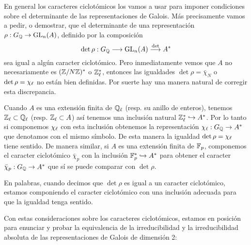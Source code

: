 \documentclass[../../tesis_maestria]{subfiles}
\begin{document}
\begin{nota}
  En general los caracteres ciclot\'omicos los vamos a usar para imponer condiciones sobre el determinante de las representaciones de Galois. M\'as precisamente vamos a pedir, o demostrar, que el determinante de una representaci\'on $\rho:G_{\mathbb{Q}}\rightarrow\mathrm{GL}_n(A)$, definido por la composici\'on
  \[
    \det\rho:G_{\mathbb{Q}}\longrightarrow\mathrm{GL}_n(A)\overset{\det}{\longrightarrow}A^*
  \]
  sea igual a alg\'un caracter ciclot\'omico. Pero inmediatamente vemos que $A$ no necesariamente es $(\mathbb{Z}/N\mathbb{Z})^*$ o $\mathbb{Z}_\ell^*$, entonces las igualdades $\det\rho=\bar{\chi}_N$ o $\det\rho=\chi_\ell$ no est\'an bien definidas. Por suerte hay una manera natural de corregir esta discrepancia.

  Cuando $A$ es una extensi\'on finita de $\mathbb{Q}_\ell$ (resp. su anillo de enteros), tenemos $\mathbb{Z}_\ell\subset\mathbb{Q}_\ell$ (resp. $\mathbb{Z}_\ell\subset A$)  as\'i tenemos una inclusi\'on natural $\mathbb{Z}_\ell^*\hookrightarrow A^*$. Por lo tanto si componemos $\chi_\ell$ con esta inclusi\'on obtenemos la representaci\'on $\chi_\ell:G_{\mathbb{Q}}\rightarrow A^*$ que denotamos con el mismo s\'imbolo. De esta manera la igualdad $\det\rho=\chi_\ell$ tiene sentido.
  De manera similar, si $A$ es una extensi\'on finita de $\mathbb{F}_p$, componemos el caracter ciclot\'omico $\bar{\chi}_p$ con la inclusi\'on $\mathbb{F}_p^*\hookrightarrow A^*$ para obtener el caracter $\bar{\chi}_p:G_{\mathbb{Q}}\rightarrow A^*$ que s\'i se puede comparar con $\det\rho$.
  
  En palabras, cuando decimos que $\det\rho$ es igual a un caracter ciclot\'omico, estamos componiendo el caracter ciclot\'omico con una inclusi\'on adecuada para que la igualdad tenga sentido.
\end{nota}

Con estas consideraciones sobre los caracteres ciclot\'omicos, estamos en posici\'on para enunciar y probar la equivalencia de la irreducibilidad y la irreducibilidad absoluta de las representaciones de Galois de dimensi\'on 2:
\end{document}
